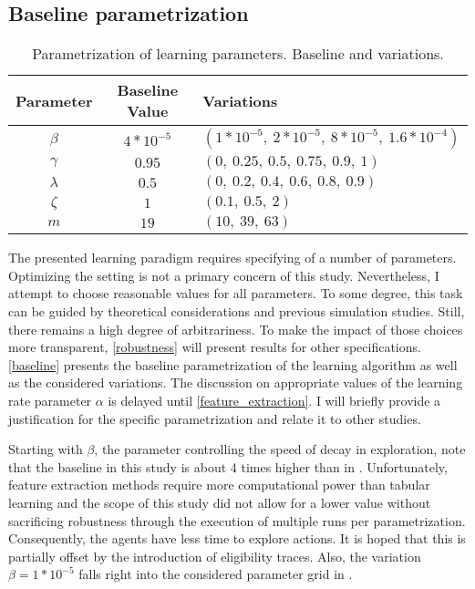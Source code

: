 \subsection{Baseline parametrization}\label{parametrization}

\begin{center}
	\begin{table}
		\begin{tabular}{|c|c|l|}
			\hline
			\textbf{Parameter}&\textbf{Baseline Value}&\textbf{Variations}\\
			\hline
			$\beta$&$4 * 10^{-5}$&$(1 * 10^{-5}, ~2 * 10^{-5}, ~8 * 10^{-5}, ~1.6 * 10^{-4})$ \\
			\hline
			$\gamma$&$0.95$&$(0, ~0.25, ~0.5, ~0.75, ~0.9, ~1)$ \\
			\hline
			$\lambda$&$0.5$&$(0, ~0.2, ~0.4, ~0.6, ~0.8, ~0.9)$ \\
			\hline
			$\zeta$&$1$&$(0.1, ~0.5, ~2)$ \\
			\hline
			$m$&$19$&$(10, ~39, ~63)$ \\
			\hline
		\end{tabular}
		\caption{Parametrization of learning parameters. Baseline and variations.}
		\label{baseline}
	\end{table}
\end{center}

The presented learning paradigm requires specifying of a number of parameters. Optimizing the setting is not a primary concern of this study. Nevertheless, I attempt to choose reasonable values for all parameters. To some degree, this task can be guided by theoretical considerations and previous simulation studies. Still, there remains a high degree of arbitrariness. To make the impact of those choices more transparent, \autoref{robustness} will present results for other specifications. \autoref{baseline} presents the baseline parametrization of the learning algorithm as well as the considered variations. The discussion on appropriate values of the learning rate parameter $\alpha$ is delayed until \autoref{feature_extraction}. I will briefly provide a justification for the specific parametrization and relate it to other studies.

Starting with $\beta$, the parameter controlling the speed of decay in exploration, note that the baseline in this study is about 4 times higher than in \textcite{calvano_algorithmic_2018}.  Unfortunately, feature extraction methods require more computational power than tabular learning and the scope of this study did not allow for a lower value without sacrificing robustness through the execution of multiple runs per parametrization. Consequently, the agents have less time to explore actions. It is hoped that this is partially offset by the introduction of eligibility traces. Also, the variation $\beta = 1*10^{-5}$ falls right into the considered parameter grid in \textcite{calvano_algorithmic_2018}.

